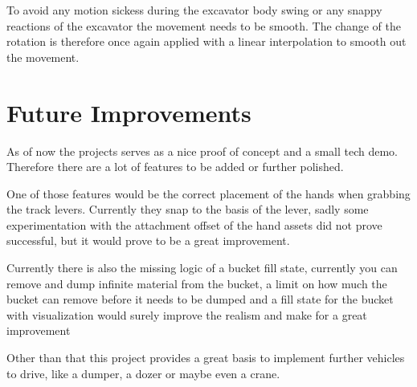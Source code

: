 \documentclass[journal]{vgtc}                     %
\begin{document}
To avoid any motion sickess during the excavator body swing or any snappy reactions of the excavator the movement needs to be smooth. The change of the rotation is therefore once again applied with a linear interpolation to smooth out the movement.

\section{Future Improvements}

As of now the projects serves as a nice proof of concept and a small tech demo. Therefore there are a lot of features to be added or further polished.

One of those features would be the correct placement of the hands when grabbing the track levers. Currently they snap to the basis of the lever, sadly some experimentation with the attachment offset of the hand assets did not prove successful, but it would prove to be a great improvement.

Currently there is also the missing logic of a bucket fill state, currently you can remove and dump infinite material from the bucket, a limit on how much the bucket can remove before it needs to be dumped and a fill state for the bucket with visualization would surely improve the realism and make for a great improvement

Other than that this project provides a great basis to implement further vehicles to drive, like a dumper, a dozer or maybe even a crane.




%
%
%


\end{document}
